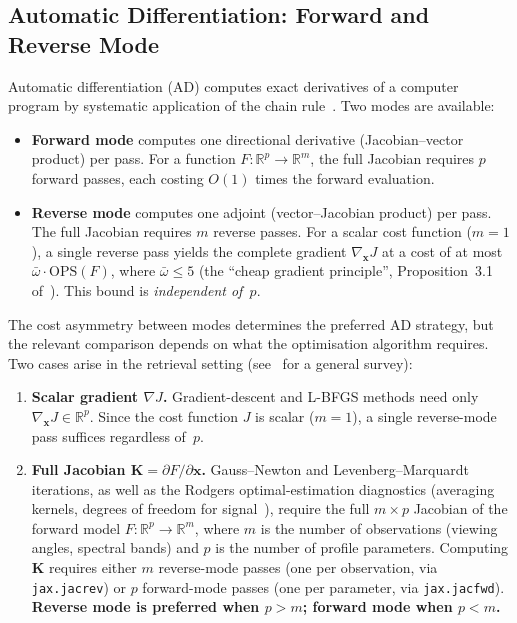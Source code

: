 \documentclass[11pt,a4paper]{article}
\newcommand{\R}{\mathbb{R}}
\newcommand{\vect}[1]{\bm{#1}}
\newcommand{\mat}[1]{\mathbf{#1}}
\theoremstyle{definition}
\begin{document}
\subsection{Automatic Differentiation: Forward and Reverse Mode}
\label{sec:ad}

Automatic differentiation (AD) computes exact derivatives of a
computer program by systematic application of the chain
rule~\cite{griewank2008}.  Two modes are available:

\begin{itemize}[nosep]
  \item \textbf{Forward mode} computes one directional derivative
    (Jacobian--vector product) per pass.  For a function
    $F : \R^p \to \R^m$, the full Jacobian requires $p$ forward passes,
    each costing $O(1)$ times the forward evaluation.
  \item \textbf{Reverse mode} computes one adjoint (vector--Jacobian
    product) per pass.  The full Jacobian requires $m$ reverse passes.
    For a scalar cost function ($m = 1$), a single reverse pass yields
    the complete gradient $\nabla_{\!\vect{x}} J$ at a cost of at most
    $\bar{\omega} \cdot \mathrm{OPS}(F)$, where $\bar{\omega} \leq 5$
    (the ``cheap gradient principle'', Proposition~3.1
    of~\cite{griewank2008}).  This bound is \emph{independent of~$p$}.
\end{itemize}

The cost asymmetry between modes determines the preferred AD strategy,
but the relevant comparison depends on what the optimisation algorithm
requires.  Two cases arise in the retrieval setting
(see~\cite{baydin2018} for a general survey):

\begin{enumerate}[nosep]
  \item \textbf{Scalar gradient $\nabla J$.}  Gradient-descent and
    L-BFGS methods need only $\nabla_{\!\vect{x}} J \in \R^p$.  Since
    the cost function $J$ is scalar ($m = 1$), a single reverse-mode
    pass suffices regardless of~$p$.

  \item \textbf{Full Jacobian $\mat{K} = \partial F / \partial \vect{x}$.}
    Gauss--Newton and Levenberg--Marquardt iterations, as well as the
    Rodgers optimal-estimation diagnostics (averaging kernels, degrees
    of freedom for signal~\cite{rodgers2000}), require the full
    $m \times p$ Jacobian of the forward model $F : \R^p \to \R^m$,
    where $m$ is the number of observations (viewing angles, spectral
    bands) and $p$ is the number of profile parameters.  Computing
    $\mat{K}$ requires either $m$ reverse-mode passes (one per
    observation, via \texttt{jax.jacrev}) or $p$ forward-mode passes
    (one per parameter, via \texttt{jax.jacfwd}).  \textbf{Reverse mode
    is preferred when $p > m$; forward mode when $p < m$.}
\end{enumerate}
\end{document}
